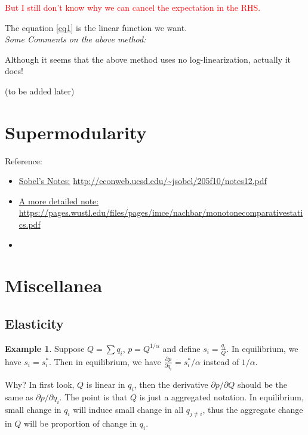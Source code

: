 \documentclass{book}
\theoremstyle{plain}
\theoremstyle{definition}
\newtheorem{exmp}{Example}[section] %
\begin{document}
\textcolor{red}
{But I still don't know why we can cancel the expectation in the RHS.}

The equation \ref{eq1} is the linear function we want.\\

\noindent
\emph{Some Comments on the above method:}

Although it seems that the above method uses no log-linearization,
actually it does!

(to be added later)




\section{Supermodularity} %
\label{sec:supermodularity}

\noindent
Reference: 
\begin{itemize}
	\item \href{run:resources/sobel_supermodularity.pdf}{Sobel's Notes:} \url{http://econweb.ucsd.edu/~jsobel/205f10/notes12.pdf}
	\item \href{run:resources/monotone_comparative_statics.pdf}{A more detailed note:} \url{https://pages.wustl.edu/files/pages/imce/nachbar/monotonecomparativestatics.pdf}
	\item {}
\end{itemize}


\section{Miscellanea} %
\label{sec:miscellanea}

\subsection{Elasticity} %
\label{sub:elasticity}

\begin{exmp}
Suppose $Q=\sum{q_i}$, $p=Q^{1/\alpha}$ and define $s_i=\frac{q_i}{Q}$. In equilibrium, we have $s_i=s_i^*$.
Then in equilibrium, we have $\frac{\partial p}{\partial q_i}=s_i^*/\alpha$ instead of $1/\alpha$.

Why? In first look, $Q$ is linear in $q_i$, then the derivative $\partial p/\partial Q$ should be the same as $\partial p/\partial q_i$.
The point is that $Q$ is just a aggregated notation.
In equilibrium, small change in $q_i$ will induce small change in all $q_{j \neq i}$, thus the aggregate change in $Q$ will be proportion of change in $q_i$.
\end{exmp}
\end{document}
